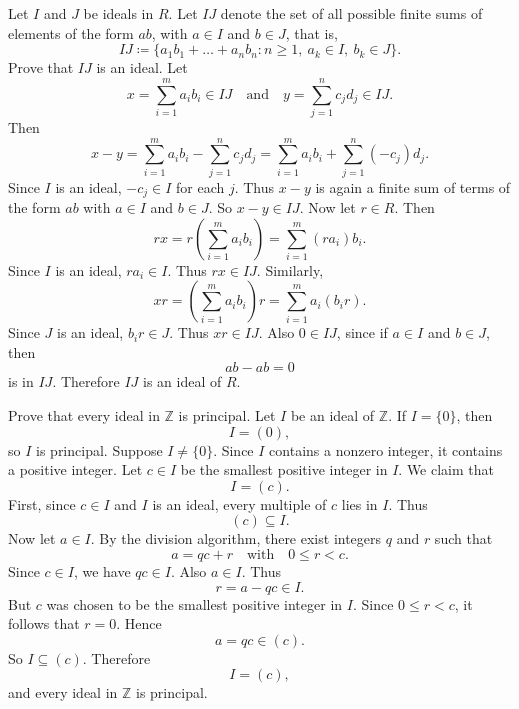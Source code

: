 \begin{problem}{
    Let $I$ and $J$ be ideals in $R$.
    Let $IJ$ denote the set of all possible finite sums of elements of the form $ab$, with $a\in I$ and $b\in J$, that is,
    \[
        IJ \coloneqq \{a_{1}b_1 + \hdots + a_{n}b_n : n\geq 1,\ a_k\in I,\ b_k\in J\}.
    \]
    Prove that $IJ$ is an ideal.
}
    Let
    \[
        x = \sum_{i=1}^m a_i b_i \in IJ
        \quad\text{and}\quad
        y = \sum_{j=1}^n c_j d_j \in IJ.
    \]
    Then
    \[
        x-y
        =
        \sum_{i=1}^m a_i b_i - \sum_{j=1}^n c_j d_j
        =
        \sum_{i=1}^m a_i b_i + \sum_{j=1}^n (-c_j)d_j.
    \]
    Since $I$ is an ideal, $-c_j\in I$ for each $j$.
    Thus $x-y$ is again a finite sum of terms of the form $ab$ with $a\in I$ and $b\in J$.
    So $x-y\in IJ$.
    Now let $r\in R$.
    Then
    \[
        rx = r\left(\sum_{i=1}^m a_i b_i\right) = \sum_{i=1}^m (ra_i)b_i.
    \]
    Since $I$ is an ideal, $ra_i\in I$.
    Thus $rx\in IJ$.
    Similarly,
    \[
        xr = \left(\sum_{i=1}^m a_i b_i\right)r = \sum_{i=1}^m a_i(b_i r).
    \]
    Since $J$ is an ideal, $b_i r\in J$.
    Thus $xr\in IJ$.
    Also $0\in IJ$, since if $a\in I$ and $b\in J$, then
    \[
        ab-ab = 0
    \]
    is in $IJ$.
    Therefore $IJ$ is an ideal of $R$.
\end{problem}
\begin{problem}{
    Prove that every ideal in $\mathbb{Z}$ is principal.
}
    Let $I$ be an ideal of $\mathbb{Z}$.
    If $I=\{0\}$, then
    \[
        I = (0),
    \]
    so $I$ is principal.
    Suppose $I\neq \{0\}$.
    Since $I$ contains a nonzero integer, it contains a positive integer.
    Let $c\in I$ be the smallest positive integer in $I$.
    We claim that
    \[
        I = (c).
    \]
    First, since $c\in I$ and $I$ is an ideal, every multiple of $c$ lies in $I$.
    Thus
    \[
        (c)\subseteq I.
    \]
    Now let $a\in I$.
    By the division algorithm, there exist integers $q$ and $r$ such that
    \[
        a = qc + r
        \quad\text{with}\quad
        0\leq r < c.
    \]
    Since $c\in I$, we have $qc\in I$.
    Also $a\in I$.
    Thus
    \[
        r = a-qc \in I.
    \]
    But $c$ was chosen to be the smallest positive integer in $I$.
    Since $0\leq r<c$, it follows that $r=0$.
    Hence
    \[
        a = qc \in (c).
    \]
    So $I\subseteq (c)$.
    Therefore
    \[
        I = (c),
    \]
    and every ideal in $\mathbb{Z}$ is principal.
\end{problem}
